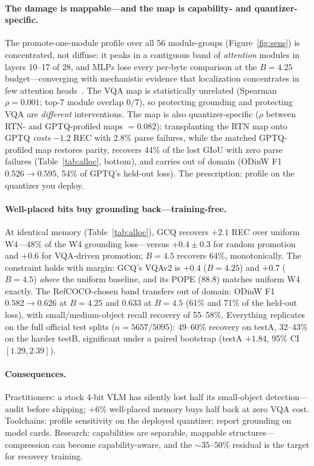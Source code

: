 \documentclass{article}
\begin{document}
\paragraph{The damage is mappable---and the map is capability- and quantizer-specific.} The promote-one-module profile over all 56 module-groups (Figure~\ref{fig:sens}) is concentrated, not diffuse: it peaks in a contiguous band of \emph{attention} modules in layers 10--17 of 28, and MLPs lose every per-byte comparison at the $B{=}4.25$ budget---converging with mechanistic evidence that localization concentrates in few attention heads~\cite{locheads,causalheads}. The VQA map is statistically unrelated (Spearman $\rho = 0.001$; top-7 module overlap $0/7$), so protecting grounding and protecting VQA are \emph{different} interventions. The map is also quantizer-specific ($\rho$ between RTN- and GPTQ-profiled maps $= 0.082$): transplanting the RTN map onto GPTQ \emph{costs} $-1.2$ REC with 2.8\% parse failures, while the matched GPTQ-profiled map restores parity, recovers 44\% of the lost GIoU with zero parse failures (Table~\ref{tab:alloc}, bottom), and carries out of domain (ODinW F1 $0.526 \to 0.595$, 54\% of GPTQ's held-out loss). The prescription: profile on the quantizer you deploy.

\paragraph{Well-placed bits buy grounding back---training-free.} At identical memory (Table~\ref{tab:alloc}), GCQ recovers $+2.1$ REC over uniform W4---48\% of the W4 grounding loss---versus $+0.4\pm0.3$ for random promotion and $+0.6$ for VQA-driven promotion; $B{=}4.5$ recovers 64\%, monotonically. The constraint holds with margin: GCQ's VQAv2 is $+0.4$ ($B{=}4.25$) and $+0.7$ ($B{=}4.5$) \emph{above} the uniform baseline, and its POPE (88.8) matches uniform W4 exactly. The RefCOCO-chosen band transfers out of domain: ODinW F1 $0.582 \to 0.626$ at $B{=}4.25$ and $0.633$ at $B{=}4.5$ (61\% and 71\% of the held-out loss), with small/medium-object recall recovery of 55--58\%. Everything replicates on the full official test splits ($n{=}5657/5095$): 49--60\% recovery on testA, 32--43\% on the harder testB, significant under a paired bootstrap (testA $+1.84$, 95\% CI $[1.29, 2.39]$).

\paragraph{Consequences.} Practitioners: a stock 4-bit VLM has silently lost half its small-object detection---audit before shipping; $+6\%$ well-placed memory buys half back at zero VQA cost. Toolchains: profile sensitivity on the deployed quantizer; report grounding on model cards. Research: capabilities are separable, mappable structures---compression can become capability-aware, and the ${\sim}35$--$50\%$ residual is the target for recovery training.
\end{document}
